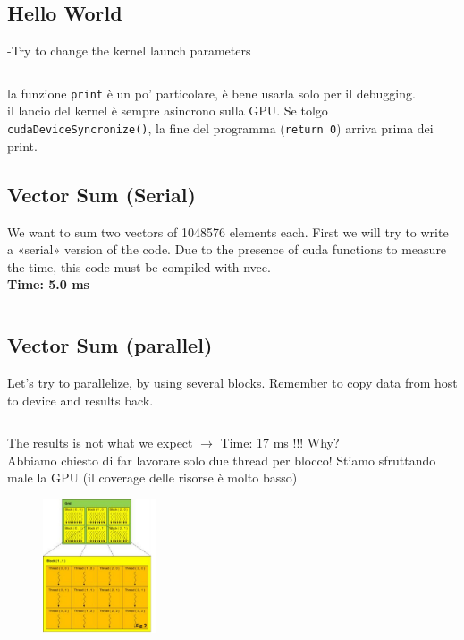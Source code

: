 \subsection{Hello World}
-Try to change the kernel launch parameters

\inputminted{c}{cuda/HelloWordGpu.cu}

la funzione \texttt{print} è un po' particolare, è bene usarla solo per il debugging.\\

il lancio del kernel è sempre asincrono sulla GPU. Se tolgo \texttt{cudaDeviceSyncronize()}, la fine del programma (\texttt{return 0}) arriva prima dei print.



\subsection{Vector Sum (Serial)}
We want to sum two vectors of 1048576 elements each. First we will try to write a «serial» version of the code. Due to the presence of cuda functions to measure the time, this code must be compiled with nvcc.\\

\textbf{Time: 5.0 ms}
\inputminted{c}{cuda/VecAdd_Serial.cu}

\subsection{Vector Sum (parallel)}

Let’s try to parallelize, by using several blocks. Remember to copy data from host to device and results back. 

\inputminted{c}{cuda/VecAdd_WithBlocks.cu}

The results is not what we expect $\rightarrow$ Time: 17 ms !!! Why?\\


Abbiamo chiesto di far lavorare solo due thread per blocco! Stiamo sfruttando male la GPU (il coverage delle risorse è molto basso)

\begin{figure}[ht]
	\centering
	\includegraphics[width=0.3\textwidth]{figure_parallel/parallel_bad.png}
\end{figure}

